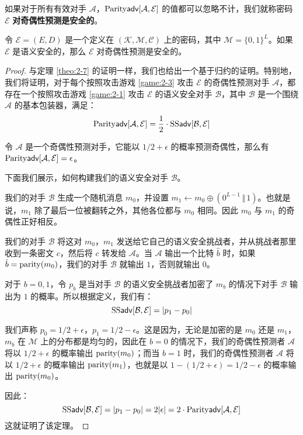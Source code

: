 \begin{definition}[奇偶性预测]
如果对于所有有效对手 $\mathcal{A}$，${\rm Parity\mathsf{adv}}[\mathcal{A},\mathcal{E}]$ 的值都可以忽略不计，我们就称密码 $\mathcal{E}$ \textbf{对奇偶性预测是安全的}。
\end{definition}

\begin{theorem}
令 $\mathcal{E}=(E,D)$ 是一个定义在 $(\mathcal{K},\mathcal{M},\mathcal{C})$ 上的密码，其中 $\mathcal{M}=\{0,1\}^L$。如果 $\mathcal{E}$ 是语义安全的，那么 $\mathcal{E}$ 对奇偶性预测是安全的。
\end{theorem}

\begin{proof}
与定理 \ref{theo:2-7} 的证明一样，我们也给出一个基于归约的证明。特别地，我们将证明，对于每个按照攻击游戏 \ref{game:2-3} 攻击 $\mathcal{E}$ 的奇偶性预测对手 $\mathcal{A}$，都存在一个按照攻击游戏 \ref{game:2-1} 攻击 $\mathcal{E}$ 的语义安全对手 $\mathcal{B}$，其中 $\mathcal{B}$ 是一个围绕 $\mathcal{A}$ 的基本包装器，满足：
\[
{\rm Parity\mathsf{adv}}[\mathcal{A},\mathcal{E}]=\frac{1}{2}\cdot{\rm SS\mathsf{adv}}[\mathcal{B},\mathcal{E}]
\]

令 $\mathcal{A}$ 是一个奇偶性预测对手，它能以 ${1}/{2}+\epsilon$ 的概率预测奇偶性，那么有 ${\rm Parity\mathsf{adv}}[\mathcal{A},\mathcal{E}]=\epsilon$。

下面我们展示，如何构建我们的语义安全对手 $\mathcal{B}$。

我们的对手 $\mathcal{B}$ 生成一个随机消息 $m_0$，并设置 $m_1\leftarrow m_0\oplus(0^{L-1}\,\Vert\,1)$。也就是说，$m_1$ 除了最后一位被翻转之外，其他各位都与 $m_0$ 相同。因此 $m_0$ 与 $m_1$ 的奇偶性正好相反。

我们的对手 $\mathcal{B}$ 将这对 $m_0$，$m_1$ 发送给它自己的语义安全挑战者，并从挑战者那里收到一条密文 $c$，然后将 $c$ 转发给 $\mathcal{A}$。当 $\mathcal{A}$ 输出一个比特 $\hat b$ 时，如果 $\hat b={\rm parity}(m_0)$，我们的对手 $\mathcal{B}$ 就输出 $1$，否则就输出 $0$。

对于 $b=0,1$，令 $p_b$ 是当对手 $\mathcal{B}$ 的语义安全挑战者加密了 $m_b$ 的情况下对手 $\mathcal{B}$ 输出为 $1$ 的概率。所以根据定义，我们有：
\[
{\rm SS\mathsf{adv}}[\mathcal{B},\mathcal{E}]=|p_1-p_0|
\]

我们声称 $p_0={1}/{2}+\epsilon$，$p_1={1}/{2}-\epsilon$。这是因为，无论是加密的是 $m_0$ 还是 $m_1$，$m_b$ 在 $\mathcal{M}$ 上的分布都是均匀的，因此在 $b=0$ 的情况下，我们的奇偶性预测者 $\mathcal{A}$ 将以 ${1}/{2}+\epsilon$ 的概率输出 ${\rm parity}(m_0)$；而当 $b=1$ 时，我们的奇偶性预测者 $\mathcal{A}$ 将以 ${1}/{2}+\epsilon$ 的概率输出 ${\rm parity}(m_1)$，也就是以 $1-({1}/{2}+\epsilon)={1}/{2}-\epsilon$ 的概率输出 ${\rm parity}(m_0)$。

因此：
\[
{\rm SS\mathsf{adv}}[\mathcal{B},\mathcal{E}]=|p_1-p_0|=2|\epsilon|=2\cdot{\rm Parity\mathsf{adv}}[\mathcal{A},\mathcal{E}]
\]
这就证明了该定理。
\end{proof}


